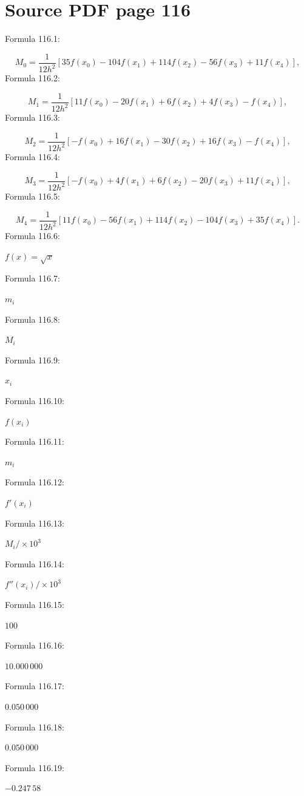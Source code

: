 \documentclass[11pt]{article}
\begin{document}
\section*{Source PDF page 116}
\noindent Formula 116.1:\par
\[
M_0=\frac1{12h^2}[35f(x_0)-104f(x_1)+114f(x_2)-56f(x_3)+11f(x_4)],
\]
\noindent Formula 116.2:\par
\[
M_1=\frac1{12h^2}[11f(x_0)-20f(x_1)+6f(x_2)+4f(x_3)-f(x_4)],
\]
\noindent Formula 116.3:\par
\[
M_2=\frac1{12h^2}[-f(x_0)+16f(x_1)-30f(x_2)+16f(x_3)-f(x_4)],
\]
\noindent Formula 116.4:\par
\[
M_3=\frac1{12h^2}[-f(x_0)+4f(x_1)+6f(x_2)-20f(x_3)+11f(x_4)],
\]
\noindent Formula 116.5:\par
\[
M_4=\frac1{12h^2}[11f(x_0)-56f(x_1)+114f(x_2)-104f(x_3)+35f(x_4)].
\]
\noindent Formula 116.6:\par
$f(x)=\sqrt{x}$\par
\noindent Formula 116.7:\par
$m_i$\par
\noindent Formula 116.8:\par
$M_i$\par
\noindent Formula 116.9:\par
$x_i$\par
\noindent Formula 116.10:\par
$f(x_i)$\par
\noindent Formula 116.11:\par
$m_i$\par
\noindent Formula 116.12:\par
$f'(x_i)$\par
\noindent Formula 116.13:\par
$M_i/\times10^3$\par
\noindent Formula 116.14:\par
$f''(x_i)/\times10^3$\par
\noindent Formula 116.15:\par
$100$\par
\noindent Formula 116.16:\par
$10.000\,000$\par
\noindent Formula 116.17:\par
$0.050\,000$\par
\noindent Formula 116.18:\par
$0.050\,000$\par
\noindent Formula 116.19:\par
$-0.247\,58$\par
\end{document}
